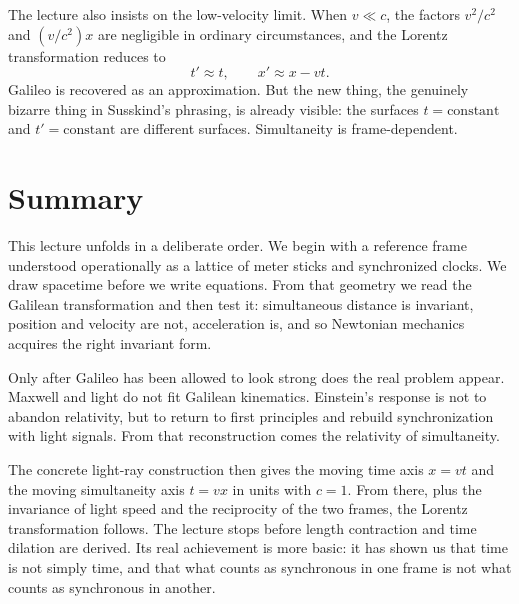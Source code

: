 The lecture also insists on the low-velocity limit. When \(v\ll c\), the factors \(v^2/c^2\) and \((v/c^2)x\) are negligible in ordinary circumstances, and the Lorentz transformation reduces to
\begin{equation}
t'\approx t,\qquad x'\approx x-vt.
\end{equation}
Galileo is recovered as an approximation. But the new thing, the genuinely bizarre thing in Susskind's phrasing, is already visible: the surfaces \(t=\text{constant}\) and \(t'=\text{constant}\) are different surfaces. Simultaneity is frame-dependent.

\section{Summary}

This lecture unfolds in a deliberate order. We begin with a reference frame understood operationally as a lattice of meter sticks and synchronized clocks. We draw spacetime before we write equations. From that geometry we read the Galilean transformation and then test it: simultaneous distance is invariant, position and velocity are not, acceleration is, and so Newtonian mechanics acquires the right invariant form.

Only after Galileo has been allowed to look strong does the real problem appear. Maxwell and light do not fit Galilean kinematics. Einstein's response is not to abandon relativity, but to return to first principles and rebuild synchronization with light signals. From that reconstruction comes the relativity of simultaneity.

The concrete light-ray construction then gives the moving time axis \(x=vt\) and the moving simultaneity axis \(t=vx\) in units with \(c=1\). From there, plus the invariance of light speed and the reciprocity of the two frames, the Lorentz transformation follows. The lecture stops before length contraction and time dilation are derived. Its real achievement is more basic: it has shown us that time is not simply time, and that what counts as synchronous in one frame is not what counts as synchronous in another.